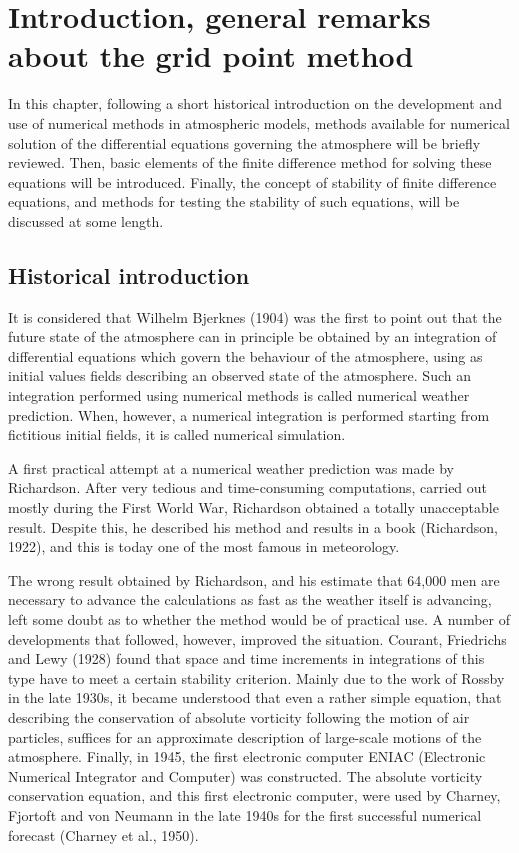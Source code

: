 \chapter{Introduction, general remarks about the grid point method}
\label{ch:intro-grid-point-method}

In this chapter, following a short historical introduction on the
development and use of numerical methods in atmospheric models, methods
available for numerical solution of the differential equations governing
the atmosphere will be briefly reviewed. Then, basic elements of the
finite difference method for solving these equations will be introduced.
Finally, the concept of stability of finite difference equations, and
methods for testing the stability of such equations, will be discussed
at some length.

\section{Historical introduction}\label{sec:historical-introduction}

It is considered that Wilhelm Bjerknes (1904) was the first to point out
that the future state of the atmosphere can in principle be obtained by
an integration of differential equations which govern the behaviour of
the atmosphere, using as initial values fields describing an observed
state of the atmosphere. Such an integration performed using numerical
methods is called numerical weather prediction. When, however, a
numerical integration is performed starting from fictitious initial
fields, it is called numerical simulation.

A first practical attempt at a numerical weather prediction was made by
Richardson. After very tedious and time-consuming computations, carried
out mostly during the First World War, Richardson obtained a totally
unacceptable result. Despite this, he described his method and results
in a book (Richardson, 1922), and this is today one of the most famous
in meteorology.

The wrong result obtained by Richardson, and his estimate that 64,000
men are necessary to advance the calculations as fast as the weather
itself is advancing, left some doubt as to whether the method would be
of practical use. A number of developments that followed, however,
improved the situation. Courant, Friedrichs and Lewy (1928) found that
space and time increments in integrations of this type have to meet a
certain stability criterion.
Mainly due to the work of Rossby in the late 1930\textquotesingle s, it became understood that even a rather
simple equation, that describing the conservation of absolute vorticity
following the motion of air particles, suffices for an approximate
description of large-scale motions of the atmosphere. Finally, in 1945,
the first electronic computer ENIAC (Electronic Numerical Integrator and
Computer) was constructed. The absolute vorticity conservation equation,
and this first electronic computer, were used by Charney, Fjortoft and
von Neumann in the late 1940\textquotesingle s for the first successful
numerical forecast (Charney et al., 1950).

